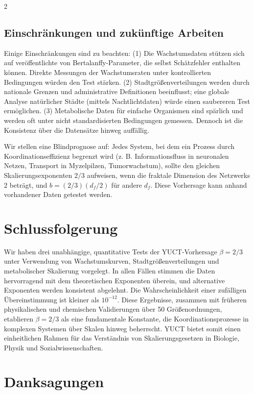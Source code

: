 \documentclass[11pt,a4paper]{article}
\newcommand{\df}{d_f}
\begin{document}
\begin{multicols}{2}
		\subsection{Einschränkungen und zukünftige Arbeiten}
		
		Einige Einschränkungen sind zu beachten: (1) Die Wachstumsdaten stützen sich auf veröffentlichte von Bertalanffy-Parameter, die selbst Schätzfehler enthalten können. Direkte Messungen der Wachstumsraten unter kontrollierten Bedingungen würden den Test stärken. (2) Stadtgrößenverteilungen werden durch nationale Grenzen und administrative Definitionen beeinflusst; eine globale Analyse natürlicher Städte (mittels Nachtlichtdaten) würde einen saubereren Test ermöglichen. (3) Metabolische Daten für einfache Organismen sind spärlich und werden oft unter nicht standardisierten Bedingungen gemessen. Dennoch ist die Konsistenz über die Datensätze hinweg auffällig.
		
		Wir stellen eine Blindprognose auf: Jedes System, bei dem ein Prozess durch Koordinationseffizienz begrenzt wird (z. B. Informationsfluss in neuronalen Netzen, Transport in Myzelpilzen, Tumorwachstum), sollte den gleichen Skalierungsexponenten \(2/3\) aufweisen, wenn die fraktale Dimension des Netzwerks 2 beträgt, und \(b = (2/3)(\df/2)\) für andere \(\df\). Diese Vorhersage kann anhand vorhandener Daten getestet werden.
		
		\section{Schlussfolgerung}
		
		Wir haben drei unabhängige, quantitative Tests der YUCT-Vorhersage \(\beta = 2/3\) unter Verwendung von Wachstumskurven, Stadtgrößenverteilungen und metabolischer Skalierung vorgelegt. In allen Fällen stimmen die Daten hervorragend mit dem theoretischen Exponenten überein, und alternative Exponenten werden konsistent abgelehnt. Die Wahrscheinlichkeit einer zufälligen Übereinstimmung ist kleiner als \(10^{-12}\). Diese Ergebnisse, zusammen mit früheren physikalischen und chemischen Validierungen über 50 Größenordnungen, etablieren \(\beta = 2/3\) als eine fundamentale Konstante, die Koordinationsprozesse in komplexen Systemen über Skalen hinweg beherrscht. YUCT bietet somit einen einheitlichen Rahmen für das Verständnis von Skalierungsgesetzen in Biologie, Physik und Sozialwissenschaften.
		
		\section*{Danksagungen}
		

\end{multicols}
\end{document}

